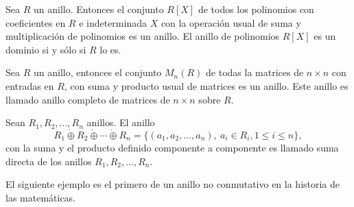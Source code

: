 \begin{ejemplo}
Sea $R$ un anillo. Entonces el conjunto $R[X]$ de todos los polinomios con coeficientes en $R$ e indeterminada  $X$ con la operación usual de suma y multiplicación de polinomios es un anillo. El anillo de polinomios $R[X]$ es un dominio si y sólo si $R$ lo es. 
\end{ejemplo}
\begin{ejemplo}
Sea $R$ un anillo, entonces el conjunto $M_n(R)$ de todas la matrices de $n\times n$ con entradas en $R$, con suma y producto usual de matrices es un anillo. Este anillo es llamado anillo completo de matrices de $n\times n$ sobre $R$.
\end{ejemplo}
\begin{ejemplo}
Sean $R_1, R_2, \dots, R_n$ anillos. El anillo \[ R_1\dot{\oplus}R_2\dot{\oplus}\cdots\dot{\oplus} R_n = \{ (a_1,a_2,\dots,a_n),\   a_i \in R_i, 1\leq i \leq n \},  \] con la suma y el producto definido componente a componente es llamado  suma directa de los anillos $R_1, R_2,\dots,R_n$.
\end{ejemplo}
El siguiente ejemplo es el primero de un anillo no conmutativo en la historia de las matemáticas. 
